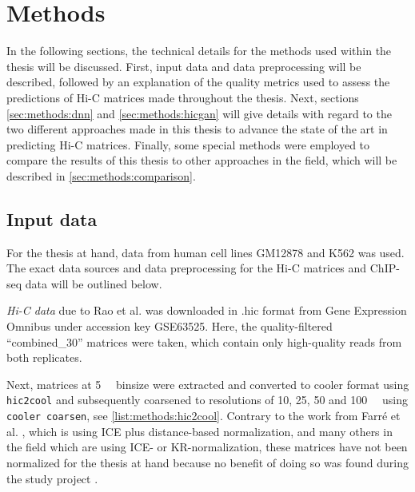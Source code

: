 \section{Methods}
In the following sections, the technical details for the methods used within the thesis will be discussed.
First, input data and data preprocessing will be described, followed by an explanation of the quality metrics used to assess the predictions
of Hi-C matrices made throughout the thesis.
Next, sections \ref{sec:methods:dnn} and \ref{sec:methods:hicgan} will give details with regard to the two 
different approaches made in this thesis to advance the state of the art in predicting Hi-C matrices.
Finally, some special methods were employed to compare the results of this thesis to 
other approaches in the field, which will be described in \ref{sec:methods:comparison}.

\subsection{Input data} \label{sec:methods:input_data}
For the thesis at hand, data from human cell lines GM12878 and K562 was used.
The exact data sources and data preprocessing for the Hi-C matrices and ChIP-seq data 
will be outlined below.

\emph{Hi-C data} due to Rao et al. \cite{Rao2014} was downloaded 
in .hic format from Gene Expression Omnibus under accession key GSE63525.
Here, the quality-filtered ``combined\_30'' matrices were taken, which contain only high-quality reads from 
both replicates.

Next, matrices at \SI{5}{\kilo\bp} binsize were extracted and converted to cooler format using \texttt{hic2cool}
and subsequently coarsened to resolutions of 10, 25, 50 and \SI{100}{\kilo\bp} using \texttt{cooler coarsen},
see \cref{list:methods:hic2cool}.
Contrary to the work from Farr\'e et al. \cite{Farre2018a}, which is using ICE plus distance-based normalization,
and many others in the field which are using ICE- or KR-normalization, 
these matrices have not been normalized for the thesis at hand
because no benefit of doing so was found during the study project \cite{Krauth2020}.

